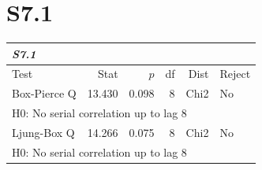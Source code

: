 \documentclass{article}
\begin{document}
\section*{S7.1}
\renewcommand{\arraystretch}{1.1}
\setlength{\tabcolsep}{6pt}
\begin{table}[H]
\centering
\begin{tabular}{lrrrrl}
\hline
\multicolumn{6}{l}{\textit{S7.1}} \\
\hline
Test & Stat & $p$ & df & Dist & Reject \\
\hline
Box-Pierce Q & 13.430 & 0.098 & 8 & Chi2 & No \\
\multicolumn{6}{l}{\footnotesize{H0: No serial correlation up to lag 8}} \\
Ljung-Box Q & 14.266 & 0.075 & 8 & Chi2 & No \\
\multicolumn{6}{l}{\footnotesize{H0: No serial correlation up to lag 8}} \\
\hline
\end{tabular}
\end{table}
\end{document}
